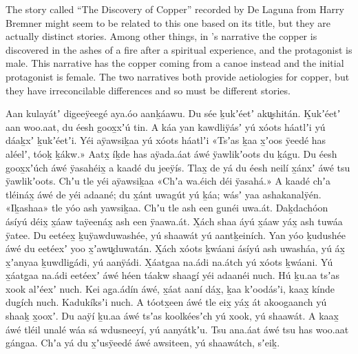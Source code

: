
The story called “The Discovery of Copper” recorded by De Laguna from  Harry Bremner \parencite[899–900]{de-laguna:1972} might seem to be related to this one based on its title, but they are actually distinct stories.
Among other things, in ’s narrative the copper is discovered in the ashes of a fire after a spiritual experience, and the protagonist is male.
This narrative has the copper coming from a canoe instead and the initial protagonist is female.
The two narratives both provide aetiologies for copper, but they have irreconcilable differences and so must be different stories.

\clearpage
\begin{pairs}
\begin{Leftside}
\beginnumbering
\pstart
\noindent
{}Aan kulayátʼ digeeÿeegé aya.óo aanḵáawu.
Du sée ḵukʼéetʼ aku̬shitán.
Ḵukʼéetʼ aan woo\-.aat, du éesh goox̱xʼú tin.
A káa yan kawdliÿásʼ yú xóots háatlʼi yú dáaḵxʼ ḵukʼéetʼi.
Yéi aÿawsi\-ḵaa yú xóots háatlʼi
«\!Tsʼas ḵaa x̱ʼoos ÿeedé has aléelʼ, tóoḵ ḵákw.\!»
Aatx̱ íḵde has aÿada.áat áwé ÿawlikʼoots du ḵágu.
Du éesh goox̱xʼúch áwé ÿa\-sahéix̱ a kaadé du jeeÿís.
Tlax̱ de yá du éesh neilí x̱ánxʼ áwé tsu ÿawlikʼoots.
Chʼu tle yéi aÿaw\-si\-ḵaa
«\!Chʼa wa.éich déi ÿasahá.\!»
A kaadé chʼa tléináx̱ áwé de yéi adaané;
du x̱ánt uwagút yú ḵáa;
wásʼ yaa ashakanalÿén.
«\!Iḵashaa\!» tle yóo ash yawsiḵaa.
Chʼu tle ash een g̱unéi uwa.át.
Daḵdachóon ásíyú déix̱ x̱áaw taÿeenáx̱ ash een ÿaawa.át.
X̱ách shaa áyú x̱áaw yáx̱ ash tuwáa ÿatee.
\pend
\pstart
{}Du eetéex̱ ḵuÿawduwashée, yú shaawát yú aantḵeiních.
Yan yóo ḵudushée áwé du eetéexʼ yoo x̱ʼawu̬duwatán.
X̱ách xóots ḵwáani ásíyú ash uwasháa, yú áx̱ x̱ʼanyaa ḵuwdlig̱ádi, yú aanÿádi.
X̱áatg̱aa na.ádi na\-.átch yú xóots ḵwáani.
Yú x̱áatg̱aa na.ádi eetéexʼ áwé héen táakw shaag̱í yéi adaanéi nuch.
Hú ḵu.aa tsʼas xook alʼéexʼ nuch.
Kei ag̱a.ádín áwé, x̱áat aaní dáx̱, ḵaa kʼoo\-dásʼi, kaax̱ kínde dug̱ích nuch.
Kadukíksʼi nuch.
A tóotx̱een áwé tle eix̱ yáx̱ át akoogaanch yú shaaḵ x̱ooxʼ.
Du aaÿí ḵu.aa áwé tsʼas koolkéesʼch yú xook, yú shaawát.
A kaax̱ áwé tléil unalé wáa sá wdusneeyí, yú aanyátkʼu.
\pend
\pstart
{}Tsu ana.áat áwé tsu has woo.aat gáng̱aa.
Chʼa yá du x̱ʼusÿeedé áwé awsiteen, yú shaa\-wátch, sʼeiḵ.

\end{Leftside}
\end{pairs}
